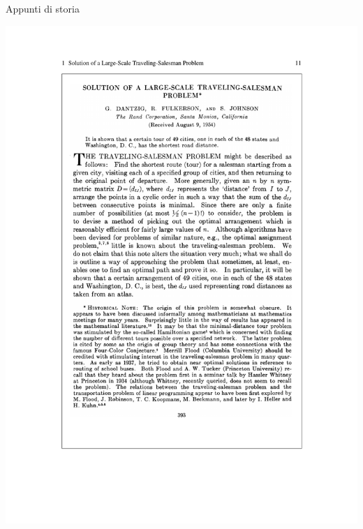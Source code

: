 \begin{OnlySlides}{Appunti di storia}
    
\includegraphics[width=\textwidth]{dantzig-1.pdf}

\end{OnlySlides}

